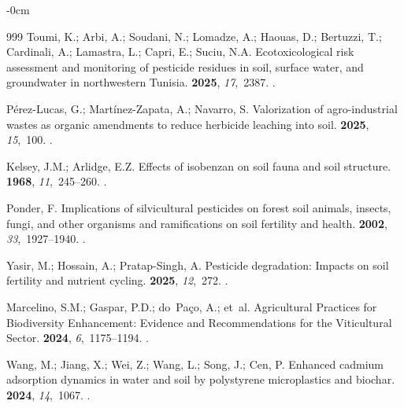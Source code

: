 \documentclass[environremediat,article,accept,pdftex,oneauthor]{Definitions/mdpi}
\begin{document}
\begin{adjustwidth}{-\extralength}{0cm}
\begin{thebibliography}{999}
Toumi, K.; Arbi, A.; Soudani, N.;   Lomadze, A.; Haouas, D.; Bertuzzi, T.; Cardinali, A.; Lamastra, L.; Capri, E.; Suciu, N.A.  Ecotoxicological risk assessment and monitoring of pesticide residues
  in soil, surface water, and groundwater in northwestern Tunisia.
 {\bf 2025}, {\em 17},~2387.
.

P{\'e}rez-Lucas, G.; Mart{\'i}nez-Zapata, A.; Navarro, S.
\newblock Valorization of agro-industrial wastes as organic amendments to
  reduce herbicide leaching into soil.
 {\bf 2025}, {\em 15},~100.
.

Kelsey, J.M.; Arlidge, E.Z.
\newblock Effects of isobenzan on soil fauna and soil structure.
 {\bf 1968}, {\em
  11},~245--260.
.

Ponder, F.
\newblock Implications of silvicultural pesticides on forest soil animals,
  insects, fungi, and other organisms and ramifications on soil fertility and
  health.
 {\bf 2002},
  {\em 33},~1927--1940.
.

Yasir, M.; Hossain, A.; Pratap-Singh, A.
\newblock Pesticide degradation: Impacts on soil fertility and nutrient
  cycling.
 {\bf 2025}, {\em 12},~272.
.

Marcelino, S.M.; Gaspar, P.D.; do~Pa{\c{c}}o, A.;  et~al.
\newblock Agricultural Practices for Biodiversity Enhancement: Evidence and
  Recommendations for the Viticultural Sector.
 {\bf 2024}, {\em 6},~1175--1194.
.

Wang, M.; Jiang, X.; Wei, Z.; Wang, L.; Song, J.; Cen, P.
\newblock Enhanced cadmium adsorption dynamics in water and soil by polystyrene
  microplastics and biochar.
 {\bf 2024}, {\em 14},~1067.
.


\end{thebibliography}
\end{adjustwidth}
\end{document}
